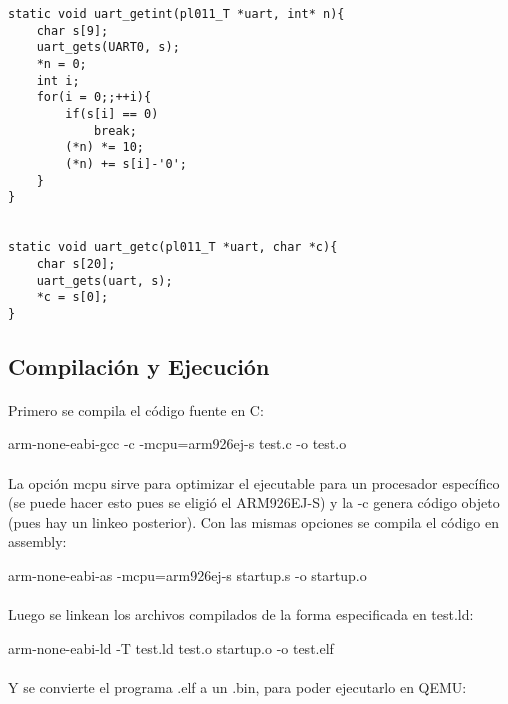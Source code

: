 \documentclass{article}
\begin{document}
\begin{lstlisting}
static void uart_getint(pl011_T *uart, int* n){
	char s[9];
	uart_gets(UART0, s);
	*n = 0;
	int i;
	for(i = 0;;++i){
		if(s[i] == 0)
			break;
		(*n) *= 10;
		(*n) += s[i]-'0';
	}
}


static void uart_getc(pl011_T *uart, char *c){
	char s[20];
	uart_gets(uart, s);
	*c = s[0];
}
\end{lstlisting}

\subsection{Compilaci\'on y Ejecuci\'on}

\paragraph{}
Primero se compila el c\'odigo fuente en C:

\begin{commandshell}
arm-none-eabi-gcc -c -mcpu=arm926ej-s test.c   -o test.o
\end{commandshell}

\paragraph{}
La opci\'on mcpu sirve para optimizar el ejecutable para un procesador espec\'ifico (se puede hacer esto pues se eligi\'o el ARM926EJ-S) y la -c genera c\'odigo objeto (pues hay un linkeo posterior). Con las mismas opciones se compila el c\'odigo en assembly:

\begin{commandshell}
arm-none-eabi-as -mcpu=arm926ej-s startup.s   -o startup.o
\end{commandshell}

\paragraph{}
Luego se linkean los archivos compilados de la forma especificada en test.ld:

\begin{commandshell}
arm-none-eabi-ld -T test.ld test.o startup.o   -o test.elf
\end{commandshell}

\paragraph{}
Y se convierte el programa .elf a un .bin, para poder ejecutarlo en QEMU:
\end{document}
